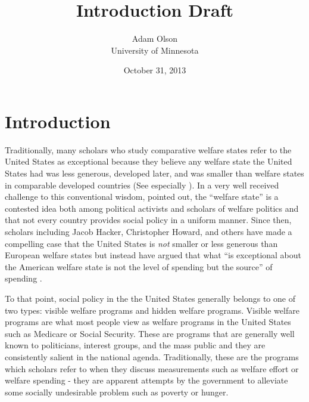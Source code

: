 \documentclass[12pt]{article}
\author{Adam Olson\\University of Minnesota}
\title{Introduction Draft}
\date{October 31, 2013}
\makeatletter
\renewcommand{\maketitle}{\bgroup\setlength{\parindent}{0pt}
\begin{flushleft}
  \textbf{\@title}

  \@author
\end{flushleft}\egroup
}
\makeatother
\begin{document}
\maketitle

\section{Introduction}
Traditionally, many scholars who study comparative welfare states refer to the United States as exceptional because they believe any welfare state the United States had was less generous, developed later, and was smaller than welfare states in comparable developed countries (See especially \citealt{andersen1990}). In a very well received challenge to this conventional wisdom, \citet{hacker2002} pointed out, the ``welfare state'' is a contested idea both among political activists and scholars of welfare politics and that not every country provides social policy in a uniform manner. Since then, scholars including Jacob Hacker, Christopher Howard, and others have made a compelling case that the United States is \emph{not} smaller or less generous than European welfare states but instead have argued that what ``is exceptional about the American welfare state is not the level of spending but the source'' of spending \citep[pg. 7]{hacker2002}.

To that point, social policy in the the United States generally belongs to one of two types: visible welfare programs and hidden welfare programs. Visible welfare programs are what most people view as welfare programs in the United States such as Medicare or Social Security. These are programs that are generally well known to politicians, interest groups, and the mass public and they are consistently salient in the national agenda. Traditionally, these are the programs which scholars refer to when they discuss measurements such as welfare effort or welfare spending - they are apparent attempts by the government to alleviate some socially undesirable problem such as poverty or hunger.
\end{document}
